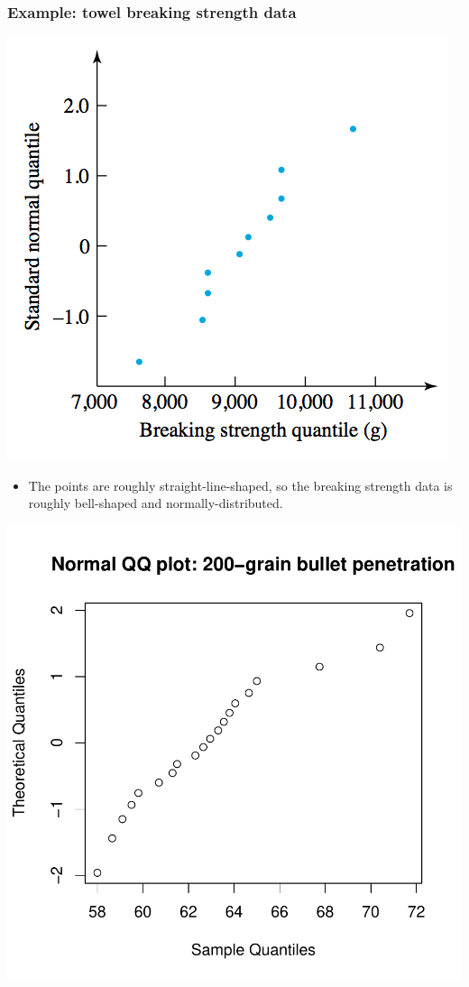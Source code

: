\documentclass{beamer}
\numberwithin{equation}{section}
\begin{document}
\begin{frame}
\frametitle{Example: towel breaking strength data}
\begin{center}
 \includegraphics{../../fig/towelqqplot.png}
\end{center}

\begin{itemize}
\item The points are roughly straight-line-shaped, so the breaking strength data is roughly bell-shaped and normally-distributed.
\end{itemize}
\end{frame}


\begin{frame}
\includegraphics{ch3part2-002}
\end{frame}
\end{document}

